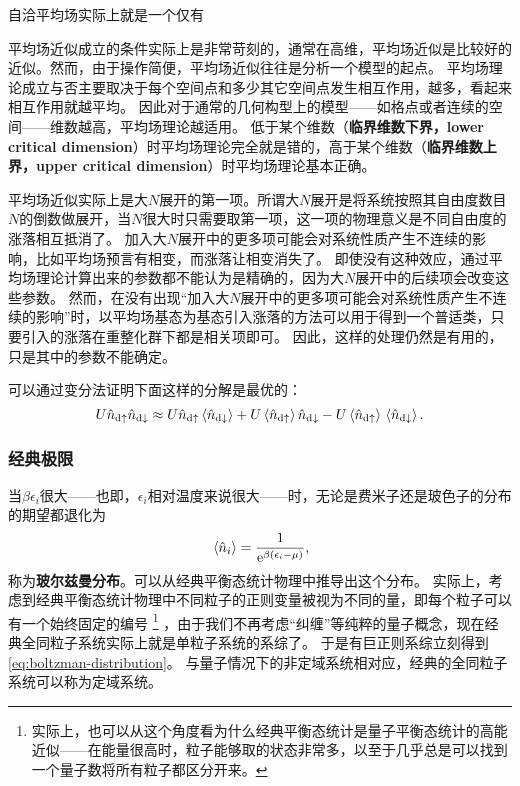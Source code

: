 \documentclass[hyperref, UTF8, a4paper]{ctexart}
\newcommand*{\ee}{\mathrm{e}}
\begin{document}
自洽平均场实际上就是一个仅有 %

平均场近似成立的条件实际上是非常苛刻的，通常在高维，平均场近似是比较好的近似。然而，由于操作简便，平均场近似往往是分析一个模型的起点。
平均场理论成立与否主要取决于每个空间点和多少其它空间点发生相互作用，越多，看起来相互作用就越平均。
因此对于通常的几何构型上的模型——如格点或者连续的空间——维数越高，平均场理论越适用。
低于某个维数（\textbf{临界维数下界，lower critical dimension}）时平均场理论完全就是错的，高于某个维数（\textbf{临界维数上界，upper critical dimension}）时平均场理论基本正确。

平均场近似实际上是大$N$展开的第一项。所谓大$N$展开是将系统按照其自由度数目$N$的倒数做展开，当$N$很大时只需要取第一项，这一项的物理意义是不同自由度的涨落相互抵消了。
加入大$N$展开中的更多项可能会对系统性质产生不连续的影响，比如平均场预言有相变，而涨落让相变消失了。
即使没有这种效应，通过平均场理论计算出来的参数都不能认为是精确的，因为大$N$展开中的后续项会改变这些参数。
然而，在没有出现“加入大$N$展开中的更多项可能会对系统性质产生不连续的影响”时，以平均场基态为基态引入涨落的方法可以用于得到一个普适类，只要引入的涨落在重整化群下都是相关项即可。
因此，这样的处理仍然是有用的，只是其中的参数不能确定。

可以通过变分法证明下面这样的分解是最优的：
\begin{equation}
    U \hat{n}_{\text{d} \uparrow} \hat{n}_{\text{d} \downarrow} \approx U \hat{n}_{\text{d} \uparrow} \expval*{\hat{n}_{\text{d} \downarrow}} + U \expval*{\hat{n}_{\text{d} \uparrow}} \hat{n}_{\text{d} \downarrow} - U \expval*{\hat{n}_{\text{d} \uparrow}} \expval*{\hat{n}_{\text{d} \downarrow}}.
\end{equation}

\subsubsection{经典极限}

当$\beta \epsilon_i$很大——也即，$\epsilon_i$相对温度来说很大——时，无论是费米子还是玻色子的分布的期望都退化为
\begin{equation}
    \expval*{\hat{n}_i} = \frac{1}{\ee^{\beta (\epsilon_i - \mu)}},
    \label{eq:boltzman-distribution}
\end{equation}
称为\textbf{玻尔兹曼分布}。可以从经典平衡态统计物理中推导出这个分布。
实际上，考虑到经典平衡态统计物理中不同粒子的正则变量被视为不同的量，即每个粒子可以有一个始终固定的编号%
\footnote{实际上，也可以从这个角度看为什么经典平衡态统计是量子平衡态统计的高能近似——在能量很高时，粒子能够取的状态非常多，以至于几乎总是可以找到一个量子数将所有粒子都区分开来。}%
，由于我们不再考虑“纠缠”等纯粹的量子概念，现在经典全同粒子系统实际上就是单粒子系统的系综了。
于是有巨正则系综立刻得到\eqref{eq:boltzman-distribution}。
与量子情况下的非定域系统相对应，经典的全同粒子系统可以称为定域系统。
\end{document}
